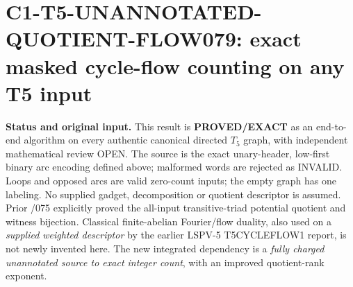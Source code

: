 \documentclass[11pt]{article}
\begin{document}
\section{C1-T5-UNANNOTATED-QUOTIENT-FLOW079: exact masked cycle-flow counting on any T5 input}
\noindent\textbf{Status and original input.}
This result is \textbf{PROVED/EXACT} as an end-to-end algorithm on every
authentic canonical directed $T_5$ graph, with independent mathematical
review OPEN. The source is the exact unary-header, low-first binary arc
encoding defined above; malformed words are rejected as INVALID.
Loops and opposed arcs are valid zero-count inputs; the empty graph has
one labeling. No supplied gadget, decomposition or quotient descriptor
is assumed. Prior /075 explicitly proved the all-input transitive-triad
potential quotient and witness bijection. Classical finite-abelian
Fourier/flow duality, also used on a \emph{supplied weighted descriptor}
by the earlier LSPV-5 T5CYCLEFLOW1 report, is not newly invented here.
The new integrated dependency is a \emph{fully charged unannotated source
to exact integer count}, with an improved quotient-rank exponent.
\end{document}
